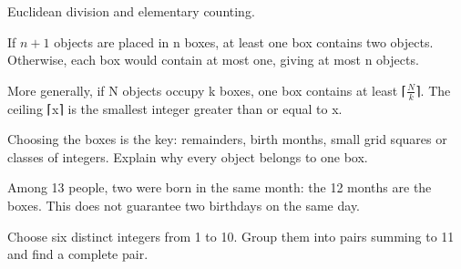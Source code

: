 \documentclass[11pt]{article}
\begin{document}
Euclidean division and elementary counting.\par
{}
If \(n + 1\) objects are placed in n boxes, at least one box contains two objects. Otherwise, each box would contain at most one, giving at most n objects.\par
More generally, if N objects occupy k boxes, one box contains at least ⌈\(\frac{N}{k}\)⌉. The ceiling ⌈x⌉ is the smallest integer greater than or equal to x.\par
Choosing the boxes is the key: remainders, birth months, small grid squares or classes of integers. Explain why every object belongs to one box.\par
{}
Among 13 people, two were born in the same month: the 12 months are the boxes. This does not guarantee two birthdays on the same day.\par
{}
Choose six distinct integers from 1 to 10. Group them into pairs summing to 11 and find a complete pair.\par
\end{document}
